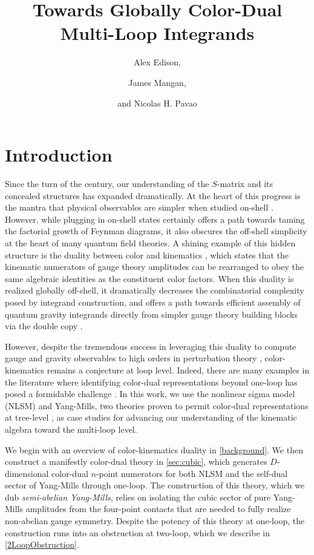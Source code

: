\documentclass[11pt,letter]{article}
\author{\large Alex Edison,}
\author{\large James Mangan,}
\author{\large and Nicolas H. Pavao}
\affiliation{Department of Physics and Astronomy, Northwestern
  University, Evanston, Illinois 60208, USA}
\title{\center  \fontsize{18.8}{20} \selectfont  Towards Globally Color-Dual Multi-Loop Integrands}
\begin{document}
\maketitle
\flushbottom
 

\section{Introduction}\label{intro}
Since the turn of the century, our understanding of the $S$-matrix and
its concealed structures has expanded dramatically. At the heart of this
progress is the mantra that physical observables are simpler when
studied on-shell
\cite{Parke:1986gb,TasiLance,Cheung:2017pzi}. However, while plugging
in on-shell states certainly offers a path towards taming the
factorial growth of Feynman diagrams, it also obscures the off-shell
simplicity at the heart of many quantum field theories. A shining
example of this hidden structure is the duality between color and
kinematics \cite{BCJ,Bern:2010ue,BCJreview}, which states that the
kinematic numerators of gauge theory amplitudes can be rearranged to
obey the same algebraic identities as the constituent color
factors. When this duality is realized globally off-shell, it
dramatically decreases the combinatorial complexity posed by integrand
construction, and offers a path towards efficient assembly of quantum
gravity integrands directly from simpler gauge theory building blocks
via the double copy \cite{BCJ,Bern:2010ue}.

However, despite the tremendous success in leveraging this duality to
compute gauge and gravity observables to high orders in perturbation
theory \cite{FiveLoopN4, GeneralizedDoubleCopyFiveLoops, Bern:2018jmv,
  Carrasco:2021otn}, color-kinematics remains a conjecture at loop
level. Indeed, there are many examples in the literature where
identifying color-dual representations beyond one-loop has posed a
formidable challenge
\cite{Mogull:2015adi, Johansson:2017bfl, KalinN2TwoLoop, Bern:2015ooa}. In this work, we use
the nonlinear sigma model (NLSM) and Yang-Mills, two theories proven
to permit color-dual representations at tree-level
\cite{Feng:2010my,Cachazo:2014xea}, as case studies for advancing our
understanding of the kinematic algebra toward the multi-loop level.

We begin with an overview of color-kinematics duality in
\cref{background}. We then construct a manifestly color-dual theory in
\cref{sec:cubic}, which generates $D$-dimensional color-dual $n$-point
numerators for both NLSM and the self-dual sector of Yang-Mills
through one-loop. The construction of this theory, which we dub
\textit{semi-abelian Yang-Mills}, relies on isolating the cubic sector
of pure Yang-Mills amplitudes from the four-point contacts that are
needed to fully realize non-abelian gauge symmetry. Despite the
potency of this theory at one-loop, the construction runs into an
obstruction at two-loop, which we describe in \cref{2LoopObstruction}.
\end{document}
